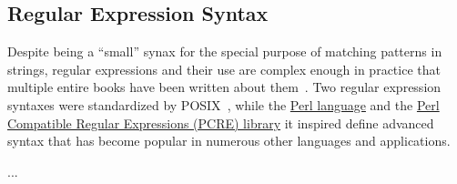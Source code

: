 \subsection{Regular Expression Syntax}
\label{sec:host:regex}

Despite being a ``small'' synax for the special purpose
of matching patterns in strings,
regular expressions and their use are complex enough in practice
that multiple entire books have been written
about them~\cite{fitzgerald12introducing,friedl06mastering,goyvaerts12regular}.
Two regular expression syntaxes were standardized
by POSIX~\cite{ieee17posix},
while the \href{https://www.perl.org}{Perl language} and the
\href{https://www.pcre.org}{Perl Compatible Regular Expressions (PCRE) library}
it inspired
define advanced syntax that has become popular
in numerous other languages and applications.

...

